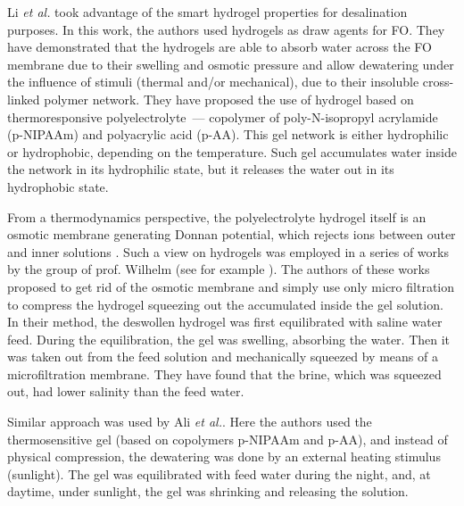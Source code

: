 \documentclass[journal,article,submit,pdftex,moreauthors]{Definitions/mdpi}
\newcommand{\etal}{\textit{et al.}{}}
\begin{document}
Li \etal \cite{Li2011} took advantage of the smart hydrogel properties for desalination purposes. In this work, the authors used hydrogels as draw agents for FO. 
They have demonstrated that the hydrogels are able to absorb water across the FO membrane due to their swelling and osmotic pressure and
allow dewatering under the influence of stimuli (thermal and/or mechanical), due to their insoluble cross-linked polymer network.
They have proposed the use of hydrogel based on thermoresponsive polyelectrolyte~--- copolymer of poly-N-isopropyl acrylamide (p-NIPAAm) and polyacrylic acid (p-AA).
This gel network is either hydrophilic or hydrophobic, depending on the temperature.
Such gel accumulates water inside the network in its hydrophilic state, but it releases the water out in its hydrophobic state.

From a thermodynamics perspective, the polyelectrolyte hydrogel itself is an osmotic membrane generating Donnan potential, which rejects ions between outer and inner solutions \cite{Wang_2014}. 
Such a view on hydrogels was employed in a series of works by the group of prof. Wilhelm (see for example \cite{Arens_2017,Fengler_2020}). 
The authors of these works proposed to get rid of the osmotic membrane and simply use only micro filtration to compress the hydrogel squeezing out the accumulated inside the gel solution. 
In their method, the deswollen hydrogel was first equilibrated with saline water feed. 
During the equilibration, the gel was swelling, absorbing the water. 
Then it was taken out from the feed solution and mechanically squeezed by means of a microfiltration membrane. 
They have found that the brine, which was squeezed out, had lower salinity than the feed water. 

Similar approach was used by Ali \etal \cite{Ali2015}. 
Here the authors used the thermosensitive gel (based on copolymers p-NIPAAm and p-AA), and instead of physical compression, the dewatering was done by an external heating stimulus (sunlight). 
The gel was equilibrated with feed water during the night, and, at daytime, under sunlight, the gel was shrinking and releasing the solution. 
\end{document}
